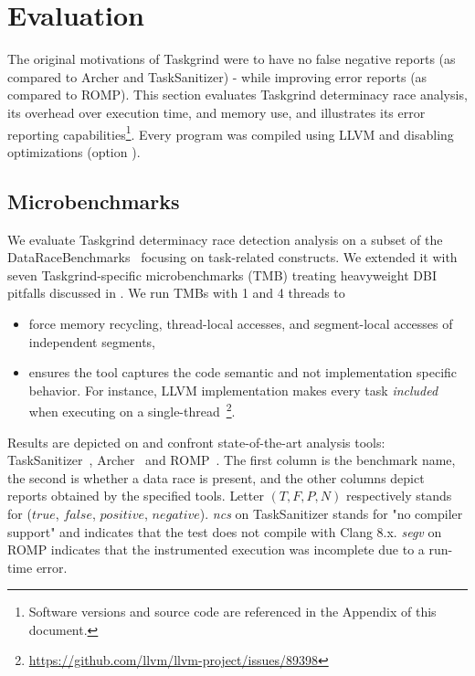 \section{Evaluation} \label{sec:eval}

The original motivations of Taskgrind were to have no false negative reports (as compared to Archer and TaskSanitizer) - while improving error reports (as compared to ROMP).
This section evaluates Taskgrind determinacy race analysis, its overhead over execution time, and memory use, and illustrates its error reporting capabilities\footnote{Software versions and source code are referenced in the Appendix of this document.}.
Every program was compiled using LLVM and disabling optimizations (option ).

\subsection{Microbenchmarks}
We evaluate Taskgrind determinacy race detection analysis on a subset of the DataRaceBenchmarks~\cite{drb} focusing on task-related constructs.
We extended it with seven Taskgrind-specific microbenchmarks (TMB) treating heavyweight DBI pitfalls discussed in .
We run TMBs with 1 and 4 threads to
\begin{itemize}
	\item	force memory recycling, thread-local accesses, and segment-local accesses of independent segments,
	\item 	ensures the tool captures the code semantic and not implementation specific behavior.
	For instance, LLVM implementation makes every task \emph{included} when executing on a single-thread~\footnote{\url{https://github.com/llvm/llvm-project/issues/89398}}.
\end{itemize}
Results are depicted on  and confront state-of-the-art analysis tools: TaskSanitizer~\cite{Matar18}, Archer~\cite{archer} and ROMP~\cite{ROMP}.
The first column is the benchmark name, the second is whether a data race is present, and the other columns depict reports obtained by the specified tools.
Letter $(T, F, P, N)$ respectively stands for ($true$, $false$, $positive$, $negative$).
\emph{ncs} on TaskSanitizer stands for "no compiler support" and indicates that the test does not compile with Clang 8.x.
\emph{segv} on ROMP indicates that the instrumented execution was incomplete due to a run-time error.

